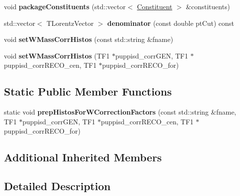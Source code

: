 \begin{DoxyCompactItemize}
\item 
\hypertarget{classttUtility_1_1ConstAK8Inputs_ad683f671c23aff9b62390768d3f4465d}{void {\bfseries package\-Constituents} (std\-::vector$<$ \hyperlink{classConstituent}{Constituent} $>$ \&constituents)}\label{classttUtility_1_1ConstAK8Inputs_ad683f671c23aff9b62390768d3f4465d}

\item 
\hypertarget{classttUtility_1_1ConstAK8Inputs_a12d0d3c568150364c47bd5df3040e9d2}{std\-::vector$<$ T\-Lorentz\-Vector $>$ {\bfseries denominator} (const double pt\-Cut) const }\label{classttUtility_1_1ConstAK8Inputs_a12d0d3c568150364c47bd5df3040e9d2}

\item 
\hypertarget{classttUtility_1_1ConstAK8Inputs_a3e3525981c06e0b48378aead76fae238}{void {\bfseries set\-W\-Mass\-Corr\-Histos} (const std\-::string \&fname)}\label{classttUtility_1_1ConstAK8Inputs_a3e3525981c06e0b48378aead76fae238}

\item 
\hypertarget{classttUtility_1_1ConstAK8Inputs_a2810eece820e004b5e34701dacbed554}{void {\bfseries set\-W\-Mass\-Corr\-Histos} (T\-F1 $\ast$puppisd\-\_\-corr\-G\-E\-N, T\-F1 $\ast$puppisd\-\_\-corr\-R\-E\-C\-O\-\_\-cen, T\-F1 $\ast$puppisd\-\_\-corr\-R\-E\-C\-O\-\_\-for)}\label{classttUtility_1_1ConstAK8Inputs_a2810eece820e004b5e34701dacbed554}

\end{DoxyCompactItemize}
\subsection*{Static Public Member Functions}
\begin{DoxyCompactItemize}
\item 
\hypertarget{classttUtility_1_1ConstAK8Inputs_ae1da3abdf5b4d0fafeb2daa57eaa2bbe}{static void {\bfseries prep\-Histos\-For\-W\-Correction\-Factors} (const std\-::string \&fname, T\-F1 $\ast$puppisd\-\_\-corr\-G\-E\-N, T\-F1 $\ast$puppisd\-\_\-corr\-R\-E\-C\-O\-\_\-cen, T\-F1 $\ast$puppisd\-\_\-corr\-R\-E\-C\-O\-\_\-for)}\label{classttUtility_1_1ConstAK8Inputs_ae1da3abdf5b4d0fafeb2daa57eaa2bbe}

\end{DoxyCompactItemize}
\subsection*{Additional Inherited Members}


\subsection{Detailed Description}

